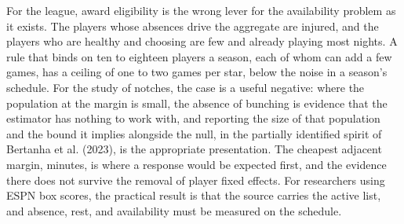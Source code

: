 \documentclass[12pt]{article}
\begin{document}
For the league, award eligibility is the wrong lever for the availability problem as it exists. The players whose absences drive the aggregate are injured, and the players who are healthy and choosing are few and already playing most nights. A rule that binds on ten to eighteen players a season, each of whom can add a few games, has a ceiling of one to two games per star, below the noise in a season's schedule. For the study of notches, the case is a useful negative: where the population at the margin is small, the absence of bunching is evidence that the estimator has nothing to work with, and reporting the size of that population and the bound it implies alongside the null, in the partially identified spirit of Bertanha et al. (2023), is the appropriate presentation. The cheapest adjacent margin, minutes, is where a response would be expected first, and the evidence there does not survive the removal of player fixed effects. For researchers using ESPN box scores, the practical result is that the source carries the active list, and absence, rest, and availability must be measured on the schedule.
\end{document}

